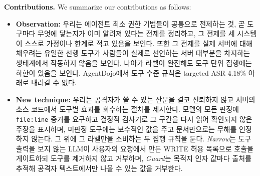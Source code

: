 \documentclass[acmsmall,screen,review,anonymous]{acmart}
\begin{document}
\noindent\textbf{Contributions.} We summarize our contributions as follows:
\begin{itemize}
    \item \textbf{Observation:} 우리는 에이전트 최소 권한 기법들이 공통으로 전제하는 것, 곧 도구마다 무엇에 닿는지가 이미 알려져 있다는 전제를 정리하고, 그 전제를 세 시스템이 스스로 가정이나 한계로 적고 있음을 보인다. 또한 그 전제를 실제 서버에 대해 채우려는 유일한 선행 도구가 사람들이 실제로 선언하는 서버 대부분을 차지하는 생태계에서 작동하지 않음을 보인다. 나아가 라벨이 완전해도 도구 단위 집행에는 하한이 있음을 보인다. AgentDojo에서 도구 수준 규칙은 targeted ASR 4.18\% 아래로 내려갈 수 없다.
    \item \textbf{New technique:} 우리는 공격자가 쓸 수 있는 산문을 결코 신뢰하지 않고 서버의 소스 코드에서 도구별 효과를 회수하는 절차를 제시한다. 모델의 모든 판정에 \texttt{file:line} 증거를 요구하고 결정적 검사기로 그 구간을 다시 읽어 확인되지 않은 주장을 표시하며, 미판정 도구에는 보수적인 값을 주고 문서만으로는 무해를 인정하지 않는다. 그 위에 그 라벨만을 소비하는 두 집행 규칙을 둔다. \emph{Narrow}는 도구 출력을 보지 않는 LLM이 사용자의 요청에서 만든 WRITE 허용 목록으로 호출을 게이트하되 도구를 제거하지 않고 거부하며, \emph{Guard}는 목적지 인자 값마다 출처를 추적해 공격자 텍스트에서만 나올 수 있는 값을 거부한다.

\end{itemize}
\end{document}
